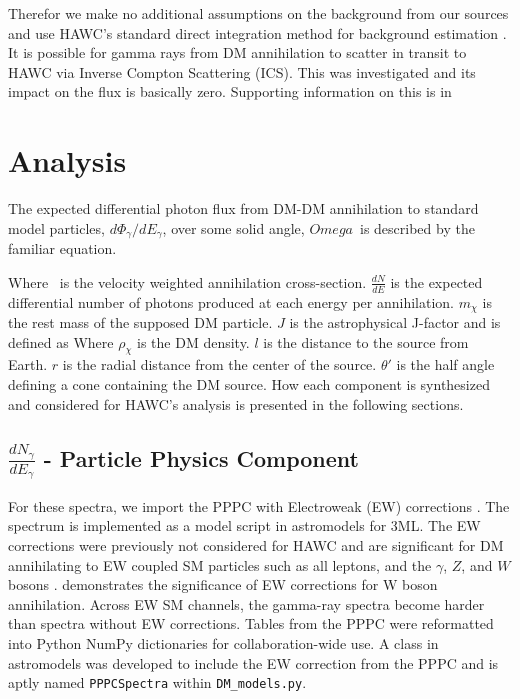 Therefor we make no additional assumptions on the background from our sources and use HAWC's standard direct integration method for background estimation \cite{Abeysekara_2017}.
It is possible for gamma rays from DM annihilation to scatter in transit to HAWC via Inverse Compton Scattering (ICS).
This was investigated and its impact on the flux is basically zero.
Supporting information on this is in 

\section{Analysis}\label{sec:gd_analysis}

The expected differential photon flux from DM-DM annihilation to standard model
particles, $d\Phi_{\gamma}/dE_{\gamma}$, over some solid angle, $Omega$~is described by the familiar equation.
\iddmannilation[\gamma]

Where \sv~is the velocity weighted annihilation cross-section.
$\frac{dN}{dE}$ is the expected differential number of photons produced at each energy per annihilation.
$m_\chi$ is the rest mass of the supposed DM particle.
$J$ is the astrophysical J-factor and is defined as
\jfactor
Where $\rho_{\chi}$ is the DM density.
$l$ is the distance to the source from Earth.
$r$ is the radial distance from the center of the source.
$\theta'$ is the half angle defining a cone containing the DM source.
How each component is synthesized and considered for HAWC's analysis is presented in the following sections.

\subsection{$\frac{dN_\gamma}{dE_\gamma}$ - Particle Physics Component}\label{sec:gd_particlephysics}

For these spectra, we import the PPPC with Electroweak (EW) corrections \cite{Cirelli_2011}.
The spectrum is implemented as a model script in astromodels for 3ML.
The EW corrections were previously not considered for HAWC and are significant for DM annihilating to EW coupled SM particles such as all leptons, and the $\gamma$, $Z$, and $W$ bosons \cite{Albert_2018}.
 demonstrates the significance of EW corrections for W boson annihilation.
Across EW SM channels, the gamma-ray spectra become harder than spectra without EW corrections.
Tables from the PPPC were reformatted into Python NumPy dictionaries for collaboration-wide use.
A class in astromodels was developed to include the EW correction from the PPPC and is aptly named \texttt{PPPCSpectra} within \texttt{DM\_models.py}.

